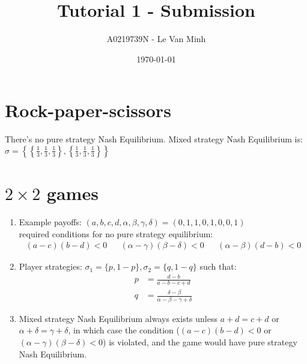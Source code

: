 \documentclass{article}
\title{Tutorial 1 - Submission}
\author{A0219739N - Le Van Minh}
\date{\today}
\begin{document}
\maketitle
\section{Rock-paper-scissors} 
There's no pure strategy Nash Equilibrium. Mixed strategy Nash Equilibrium is: $\sigma = \left\{ \left\{ \frac{1}{3},\frac{1}{3},\frac{1}{3}\right\}, \left\{\frac{1}{3},\frac{1}{3},\frac{1}{3}\right\}  \right\}$

\section{$2\times 2$ games}
\begin{enumerate}
  \item Example payoffs: $(a,b,c,d,\alpha,\beta,\gamma,\delta) = (0,1,1,0,1,0,0,1) $ \\
    required conditions for no pure strategy equilibrium:
      \begin{align*}
        (a-c)(b-d) < 0 && (\alpha - \gamma)(\beta - \delta) < 0 && (\alpha-\beta)(d-b) < 0
      \end{align*}
  \item Player strategies: $\sigma_1 = \{p,1-p\}, \sigma_2 = \{ q, 1-q \}$ such that:
  \begin{align*}
    p &= \frac{d-b}{a-b-c+d} \\
    q &= \frac{\delta - \beta}{\alpha-\beta-\gamma+\delta }
  \end{align*}
\item Mixed strategy Nash Equilibrium always exists unless $a+d = c+d$ or $\alpha + \delta = \gamma + \delta$, in which case the condition ($(a-c)(b-d) < 0$ or $(\alpha - \gamma)(\beta - \delta) < 0$) is violated, and the game would have pure strategy Nash Equilibrium.
\end{enumerate}

\end{document}
